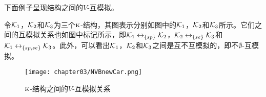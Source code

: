 %


下面例子呈现结构之间的$V$-互模拟。
\begin{example}\label{exam:vB}
	令${\cal K}_1$，${\cal K}_2$和${\cal K}_3$为三个$\textsc{k}$-结构，其图表示分别如图中的${\cal K}_1$，${\cal K}_2$和${\cal K}_3$所示。它们之间的互模拟关系也如图中标记所示，即${\cal K}_1 \leftrightarrow_{\{sp\}} {\cal K}_2$，${\cal K}_2 \leftrightarrow_{\{se\}} {\cal K}_3$和${\cal K}_1 \leftrightarrow_{\{sp,se\}} {\cal K}_3$。此外，可以看出${\cal K}_1$，${\cal K}_2$和${\cal K}_3$之间是互不互模拟\cite{Baier:PMC:2008}的，即不$\emptyset$-互模拟。
	\begin{figure*}[!htb]
		\centering
		\texttt{[image: chapter03/NVBnewCar.png]}\\
		\caption{$\textsc{k}$-结构之间的$V$-互模拟关系}
		\label{Fig:chapter05:v1uv2}
	\end{figure*}
\end{example}

 
 
